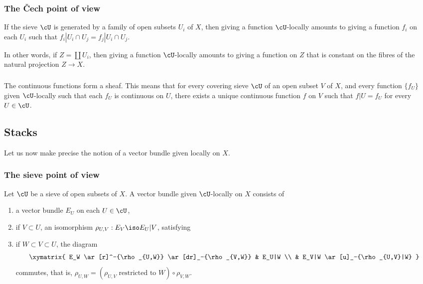 \subsubsection{The Čech point of view}\label{I:1-2-2}

If the sieve $\cU$ is generated by a family of open subsets $U_i$ of $X$,
then giving a function $\cU$-locally amounts to giving a function $f_i$
on each $U_i$ such that
$f_i|{U_i\cap U_j} = f_j|{U_i\cap U_j}$.

In other words, if $Z=\coprod U_i$, then giving a function
$\cU$-locally amounts to giving a function on $Z$ that is constant on the
fibres of the natural projection $Z\to X$.

\subsubsection{}\label{I:1-2-3}

The continuous functions form a sheaf. This means that for every covering
sieve $\cU$ of an open subset $V$ of $X$, and every function
$\{f_U\}$ given $\cU$-locally such that each $f_U$ is continuous on
$U$, there exists a unique continuous function $f$ on $V$ such that
$f|U=f_U$ for every $U\in \cU$.

\subsection{Stacks}\label{I:1-3}

Let us now make precise the notion of a vector bundle given locally on $X$.

\subsubsection{The sieve point of view}\label{I:1-3-1}

Let $\cU$ be a sieve of open subsets of $X$. A vector bundle given
$\cU$-locally on $X$ consists of
\begin{enumerate}[\indent a)]
  \item {}a vector bundle $E_U$ on each $U\in \cU$,
  \item if $V\subset U$, an isomorphism
    $\rho_{U,V}:E_V\iso E_U|V$, satisfying
  \item if $W\subset V\subset U$, the diagram
    \[\xymatrix{
      E_W \ar[r]^-{\rho_{U,W}} \ar[dr]_-{\rho_{V,W}}
        & E_U|W \\
      & E_V|W \ar[u]_-{\rho_{U,V}|W}
    }\]
    commutes, that is,
    $\rho_{U,W} = (\mbox{$\rho_{U,V}$ restricted to $W$}) \circ \rho_{V,W}$.
\end{enumerate}

